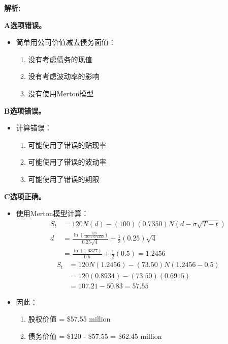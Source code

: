 \documentclass{article}
\newenvironment{explanation}
{\textbf{解析:}\par}
{\par}
\begin{document}
\begin{explanation}
    \textbf{A选项错误。}
    \begin{itemize}
        \item 简单用公司价值减去债务面值：
        \begin{enumerate}
            \item 没有考虑债务的现值
            \item 没有考虑波动率的影响
            \item 没有使用Merton模型
        \end{enumerate}
    \end{itemize}
    
    \textbf{B选项错误。}
    \begin{itemize}
        \item 计算错误：
        \begin{enumerate}
            \item 可能使用了错误的贴现率
            \item 可能使用了错误的波动率
            \item 可能使用了错误的期限
        \end{enumerate}
    \end{itemize}
    
    \textbf{C选项正确。}
    \begin{itemize}
        \item 使用Merton模型计算：
        \[
        \begin{aligned}
        S_t &= 120N(d) - (100)(0.7350)N(d - \sigma\sqrt{T-t}) \\
        d &= \frac{\ln\left(\frac{120}{100 \times 0.7350}\right)}{0.25\sqrt{4}} + \frac{1}{2}(0.25)\sqrt{4} \\
        &= \frac{\ln(1.6327)}{0.5} + \frac{1}{2}(0.5) = 1.2456
        \end{aligned}
        \]
        \[
        \begin{aligned}
        S_t &= 120N(1.2456) - (73.50)N(1.2456 - 0.5) \\
        &= 120(0.8934) - (73.50)(0.6915) \\
        &= 107.21 - 50.83 = 57.55
        \end{aligned}
        \]
        \item 因此：
        \begin{enumerate}
            \item 股权价值 = \$57.55 million
            \item 债务价值 = \$120 - \$57.55 = \$62.45 million
        \end{enumerate}
    \end{itemize}
    

\end{explanation}
\end{document}
